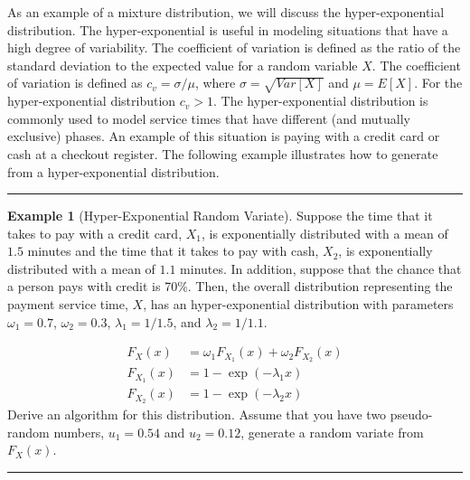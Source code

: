 \documentclass[
]{book}
\theoremstyle{definition}
\theoremstyle{definition}
\newtheorem{example}{Example}[chapter]
\theoremstyle{definition}
\theoremstyle{definition}
\theoremstyle{remark}
\begin{document}
As an example of a mixture distribution, we will discuss the
hyper-exponential distribution. The hyper-exponential is useful in
modeling situations that have a high degree of variability. The
coefficient of variation is defined as the ratio of the standard
deviation to the expected value for a random variable \(X\). The
coefficient of variation is defined as \(c_{v} = \sigma/\mu\), where \(\sigma = \sqrt{Var\left[X \right]}\) and \(\mu = E\left[X\right]\). For the hyper-exponential
distribution \(c_{v} > 1\). The hyper-exponential distribution is commonly
used to model service times that have different (and mutually exclusive)
phases. An example of this situation is paying with a credit card or
cash at a checkout register. The following example illustrates how to generate from a hyper-exponential distribution.

\begin{center}\rule{0.5\linewidth}{0.5pt}\end{center}

\begin{example}[Hyper-Exponential Random Variate]
\protect\hypertarget{exm:HyperExpRV}{}{\label{exm:HyperExpRV} {} }Suppose the time that it takes to pay with a credit card, \(X_{1}\), is exponentially
distributed with a mean of \(1.5\) minutes and the time that it takes to
pay with cash, \(X_{2}\), is exponentially distributed with a mean of
\(1.1\) minutes. In addition, suppose that the chance that a person pays
with credit is 70\%. Then, the overall distribution representing the
payment service time, \(X\), has an hyper-exponential distribution with
parameters \(\omega_{1} = 0.7\), \(\omega_{2} = 0.3\),
\(\lambda_{1} = 1/1.5\), and \(\lambda_{2} = 1/1.1\).

\[
\begin{split}
F_{X}(x) & = \omega_{1}F_{X_{1}}(x) + \omega_{2}F_{X_{2}}(x)\\
F_{X_{1}}(x) & = 1 - \exp \left( -\lambda_{1} x \right) \\
F_{X_{2}}(x) & = 1 - \exp \left( -\lambda_{2} x \right)
\end{split}
\]
Derive an algorithm for this distribution. Assume that you have two
pseudo-random numbers, \(u_1 = 0.54\) and \(u_2 = 0.12\), generate a random
variate from \(F_{X}(x)\).
\end{example}

\begin{center}\rule{0.5\linewidth}{0.5pt}\end{center}
\end{document}
